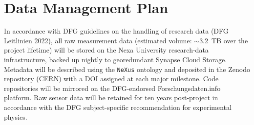 \section{Data Management Plan}
\label{sec:data}

In accordance with DFG guidelines on the handling of research data (DFG
Leitlinien 2022), all raw measurement data (estimated volume: $\sim$3.2~TB over the
project lifetime) will be stored on the Nexa University research-data infrastructure,
backed up nightly to georedundant Synapse Cloud Storage. Metadata will be described
using the \texttt{NeXus} ontology and deposited in the Zenodo repository (CERN)
with a DOI assigned at each major milestone. Code repositories will be mirrored on
the DFG-endorsed Forschungsdaten.info platform. Raw sensor data will be retained for
ten years post-project in accordance with the DFG subject-specific recommendation for
experimental physics.

